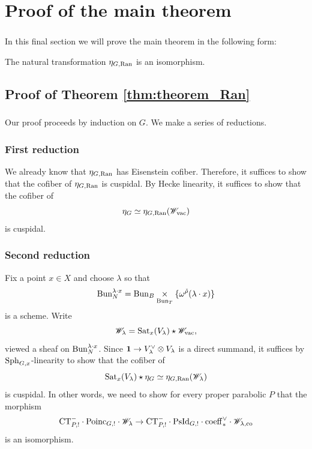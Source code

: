 \section{Proof of the main theorem} 
\label{section:3_morphism}

\subsubsection{} In this final section we will prove the main theorem in the following form:

\begin{theorem}
\label{thm:theorem_Ran}
The natural transformation $\eta_{G,\mathrm{Ran}}$ is an isomorphism.
\end{theorem}

\subsection{Proof of Theorem \ref{thm:theorem_Ran}}

\subsubsection{} Our proof proceeds by induction on $G$. We make a series of reductions.

\subsubsection{First reduction} We already know that $\eta_{G,\mathrm{Ran}}$ has Eisenstein cofiber. Therefore, it suffices to show that the cofiber of $\eta_{G, \mathrm{Ran}}$ is cuspidal. By Hecke linearity, it suffices to show that the cofiber of
    \[\eta_G \simeq \eta_{G,\mathrm{Ran}}(\mathscr{W}_{\mathrm{vac}})\]
is cuspidal.

\subsubsection{Second reduction} Fix a point $x \in X$ and choose $\lambda$ so that
    \[\mathrm{Bun}_N^{\lambda \cdot x} = \mathrm{Bun}_B \underset{\mathrm{Bun}_T}{\times} \{\omega^{{\check{\rho}}}(\lambda \cdot x)\}\]
is a scheme. Write
    \[\mathscr{W}_\lambda = \mathrm{Sat}_x(V_\lambda) \star \mathscr{W}_{\mathrm{vac}},\]
viewed a sheaf on $\mathrm{Bun}_N^{\lambda \cdot x}$. Since $\mathbf{1} \to V_\lambda^\vee \otimes V_\lambda$ is a direct summand, it suffices by $\mathrm{Sph}_{G,x}$-linearity to show that the cofiber of
    \[\mathrm{Sat}_x(V_\lambda) \star \eta_G \simeq \eta_{G,\mathrm{Ran}}(\mathscr{W}_\lambda)\]
is cuspidal. In other words, we need to show for every proper parabolic $P$ that the morphism
\begin{equation}
\label{eqn:CT_eta}
    \mathrm{CT}_{P,!}^- \cdot \mathrm{Poinc}_{G,!} \cdot \mathscr{W}_\lambda \to \mathrm{CT}_{P,!}^- \cdot \mathrm{PsId}_{G,!} \cdot \mathrm{coeff}_*^\vee \cdot \mathscr{W}_{\lambda, \mathrm{co}}
\end{equation}
is an isomorphism.

